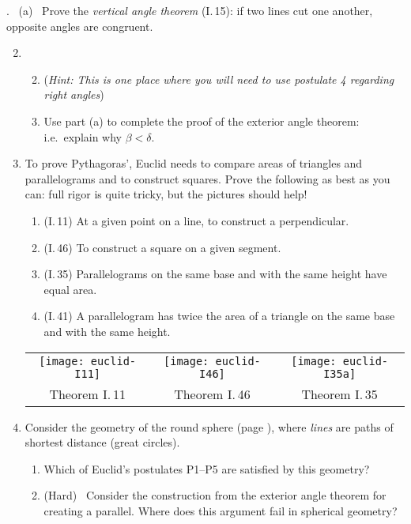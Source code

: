 \begin{exercises}
\hangindent{}. \ (a) \ Prove the \emph{vertical angle theorem} (I.\,15): if two lines cut one another, opposite angles are congruent.\vspace{-8pt}

\begin{enumerate}\setcounter{enumi}{1}
  \item[]\begin{enumerate}\setcounter{enumii}{1}
    \item[](\emph{Hint: This is one place where you will need to use postulate 4 regarding right angles})
    \item Use part (a) to complete the proof of the exterior angle theorem: i.e.\ explain why $\beta<\delta$.
  \end{enumerate}

	\item\label{ex:pythagexs} To prove Pythagoras', Euclid needs to compare areas of triangles and parallelograms and to construct squares. Prove the following as best as you can: full rigor is quite tricky, but the pictures should help!
	\begin{enumerate}
	  \item (I.\,11) At a given point on a line, to construct a perpendicular.
	  \item (I.\,46) To construct a square on a given segment.
	  \item (I.\,35) Parallelograms on the same base and with the same height have equal area.
	  \item (I.\,41) A parallelogram has twice the area of a triangle on the same base and with the same height.
	\end{enumerate}
	
	\begin{center}
	\begin{tabular}{ccc}
	\texttt{[image: euclid-I11]}
	&
	\texttt{[image: euclid-I46]}
	&
	\texttt{[image: euclid-I35a]}
	\\[-2pt]
	Theorem I.\,11
	&
	Theorem I.\,46
	&
	Theorem I.\,35
	\end{tabular}
	\end{center}
	
	
  
  \item Consider the geometry of the round sphere (page \pageref{pg:sphere}), where \emph{lines} are paths of shortest distance (great circles).
 	\begin{enumerate}
 	  \item Which of Euclid's postulates P1--P5 are satisfied by this geometry?
  	\item (Hard) \ Consider the construction from the exterior angle theorem for creating a parallel. Where does this argument fail in spherical geometry? 
 	\end{enumerate}
  

\end{enumerate}
\end{exercises}
